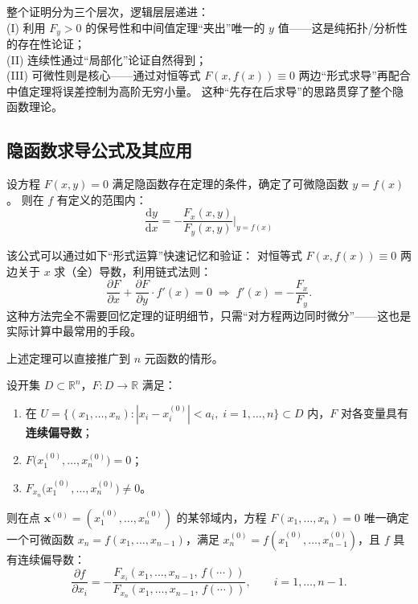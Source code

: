 \documentclass[lang=cn,11pt]{elegantbook}
\begin{document}
\begin{remark}[证明思路总结] 
整个证明分为三个层次，逻辑层层递进：\\
(I) 利用 $F_y>0$ 的保号性和中间值定理“夹出”唯一的 $y$ 值——这是纯拓扑/分析性的存在性论证；\\
(II) 连续性通过“局部化”论证自然得到；\\
(III) 可微性则是核心——通过对恒等式 $F(x,f(x))\equiv 0$ 两边“形式求导”再配合中值定理将误差控制为高阶无穷小量。
这种“先存在后求导”的思路贯穿了整个隐函数理论。
\end{remark}


\subsection{隐函数求导公式及其应用}

\begin{property} \label{property:implicit-deriv-formula}
设方程 $F(x,y)=0$ 满足隐函数存在定理的条件，确定了可微隐函数 $y=f(x)$。
则在 $f$ 有定义的范围内：
\[
\boxed{\;
\frac{\mathrm{d}y}{\mathrm{d}x}
=-\frac{F_x(x,y)}{F_y(x,y)}
\Biggr|_{y=f(x)}
\;}
\]
\end{property}

\begin{note}[公式的推导记忆]
该公式可以通过如下“形式运算”快速记忆和验证：
对恒等式 $F(x,f(x))\equiv 0$ 两边关于 $x$ 求（全）导数，利用链式法则：
\[
\frac{\partial F}{\partial x} + \frac{\partial F}{\partial y}\cdot f'(x)=0
\;\Longrightarrow\;
f'(x)=-\frac{F_x}{F_y}.
\]
这种方法完全不需要回忆定理的证明细节，只需“对方程两边同时微分”——这也是实际计算中最常用的手段。
\end{note}

上述定理可以直接推广到 $n$ 元函数的情形。

\begin{theorem}[多元隐函数存在定理] \label{thm:implicit-function-nvar}
设开集 $D\subset\mathbb R^n$，$F:D\to\mathbb R$ 满足：
\begin{enumerate}
  \item 在 $U=\{(x_1,\dots,x_n):|x_i-x_i^{(0)}|<a_i,\;i=1,\dots,n\}\subset D$ 内，$F$ 对各变量具有\textbf{连续偏导数}；
  \item $F\bigl(x_1^{(0)},\dots,x_n^{(0)}\bigr)=0$；
  \item $F_{x_n}\bigl(x_1^{(0)},\dots,x_n^{(0)}\bigr) \neq 0$。
\end{enumerate}
则在点 $\boldsymbol{x}^{(0)}=(x_1^{(0)},\dots,x_n^{(0)})$ 的某邻域内，方程 $F(x_1,\dots,x_n)=0$ 唯一确定一个可微函数 $x_n=f(x_1,\dots,x_{n-1})$，满足 $x_n^{(0)}=f(x_1^{(0)},\dots,x_{n-1}^{(0)})$，且 $f$ 具有连续偏导数：
\[
\boxed{
\frac{\partial f}{\partial x_i}
=-\frac{F_{x_i}(x_1,\dots,x_{n-1},\,f(\cdots))}
       {F_{x_n}(x_1,\dots,x_{n-1},\,f(\cdots))},
\qquad i=1,\dots,n-1.
}
\]
\end{theorem}
\end{document}
